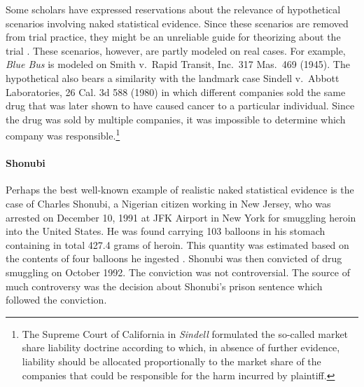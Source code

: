 \documentclass{article}
\begin{document}
Some scholars have expressed reservations about the relevance of hypothetical scenarios involving naked statistical evidence. Since these scenarios are removed from trial practice, they might be an unreliable guide for theorizing about the trial  \citep{Schmalbeck86,dant1988gambling,Allen2001Naturalized}.
These scenarios, however, are partly modeled on real cases. For example, \textit{Blue Bus} is modeled on Smith v.\ Rapid Transit, Inc.\ 317 Mas.\ 469
(1945). The hypothetical also bears a similarity with the landmark case Sindell v.\ Abbott Laboratories, 26 Cal. 3d 588 (1980) in which different companies sold the same drug that was later shown to have caused cancer to a particular individual. Since the drug was sold by multiple companies, it was impossible to determine which company was responsible.\footnote{The Supreme Court of California in \textit{Sindell} formulated the so-called market share liability doctrine according to which, in absence of further evidence, liability should be allocated proportionally to the market share of the companies that could be responsible for the harm incurred by plaintiff.} %
%
%


\paragraph{Shonubi}

Perhaps the best well-known example of realistic naked statistical evidence is
the case of Charles Shonubi, a Nigerian citizen working in New Jersey, who was arrested on December 10, 1991 at JFK Airport in New York for smuggling heroin into the United States. He was found carrying 103 balloons in his stomach containing in total 427.4 grams of heroin. This quantity was estimated based on the contents of four balloons he ingested \citep{izenman2000assessing}.
Shonubi was then convicted of drug smuggling on October 1992. 
The conviction was not controversial. The source of much controversy was the decision about Shonubi's prison sentence which followed the conviction. 
\end{document}
